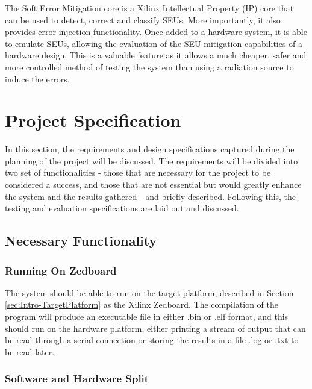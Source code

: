 \documentclass[12pt]{article}
\begin{document}
The Soft Error Mitigation core is a Xilinx Intellectual Property (IP) core that can be used to detect, correct and classify SEUs. More importantly, it also provides error injection functionality\cite{SEM}. Once added to a hardware system, it is able to emulate SEUs, allowing the evaluation of the SEU mitigation capabilities of a hardware design. This is a valuable feature as it allows a much cheaper, safer and more controlled method of testing the system than using a radiation source to induce the errors. 

\newpage

\section{Project Specification}
\label{sec:ProjSpec}

In this section, the requirements and design specifications captured during the planning of the project will be discussed. The requirements will be divided into two set of functionalities - those that are necessary for the project to be considered a success, and those that are not essential but would greatly enhance the system and the results gathered - and briefly described. Following this, the testing and evaluation specifications are laid out and discussed.

\subsection{Necessary Functionality}
\label{sec:ProjSpec-Necessary}

\subsubsection{Running On Zedboard}
\label{sec:ProjSpec-Necessary-Zedboard}

The system should be able to run on the target platform, described in Section \ref{sec:Intro-TargetPlatform} as the Xilinx Zedboard. The compilation of the program will produce an executable file in either .bin or .elf format, and this should run on the hardware platform, either printing a stream of output that can be read through a serial connection or storing the results in a file .log or .txt to be read later.

\subsubsection{Software and Hardware Split}
\label{sec:ProjSpec-Necessary-split}
\end{document}
